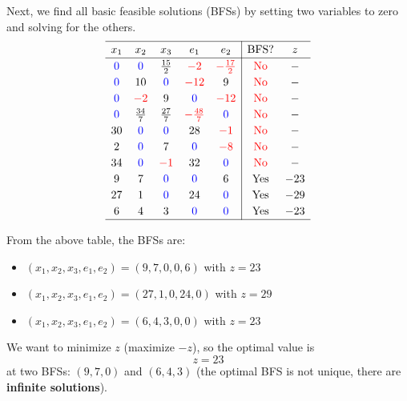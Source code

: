 \documentclass[a4paper, 10pt]{article}
\begin{document}
\begin{tosubmit}
Next, we find all basic feasible solutions (BFSs) by setting two variables to zero and solving for the others.
\[
\renewcommand{\arraystretch}{1.2}
\begin{array}{ccccc|cc}
    \hline
    x_1 & x_2 & x_3 & e_1 & e_2 & \text{BFS}? & z \\
    \hline
    \textcolor[HTML]{0000FF}{0} & \textcolor[HTML]{0000FF}{0} & \frac{15}{2} & \textcolor[HTML]{FF0000}{-2} & \textcolor[HTML]{FF0000}{-\frac{17}{2}} & \textcolor[HTML]{FF0000}{\text{No}} & - \\
    \textcolor[HTML]{0000FF}{0} & 10 & \textcolor[HTML]{0000FF}{0} & \textcolor[HTML]{FF0000}{-12} & 9 & \textcolor[HTML]{FF0000}{\text{No}} & - \\
    \textcolor[HTML]{0000FF}{0} & \textcolor[HTML]{FF0000}{-2} & 9 & \textcolor[HTML]{0000FF}{0} & \textcolor[HTML]{FF0000}{-12} & \textcolor[HTML]{FF0000}{\text{No}} & - \\
    \textcolor[HTML]{0000FF}{0} & \frac{34}{7} & \frac{27}{7} & \textcolor[HTML]{FF0000}{-\frac{48}{7}} & \textcolor[HTML]{0000FF}{0} & \textcolor[HTML]{FF0000}{\text{No}} & - \\
    30 & \textcolor[HTML]{0000FF}{0} & \textcolor[HTML]{0000FF}{0} & 28 & \textcolor[HTML]{FF0000}{-1} & \textcolor[HTML]{FF0000}{\text{No}} & - \\
    2 & \textcolor[HTML]{0000FF}{0} & 7 & \textcolor[HTML]{0000FF}{0} & \textcolor[HTML]{FF0000}{-8} & \textcolor[HTML]{FF0000}{\text{No}} & - \\
    34 & \textcolor[HTML]{0000FF}{0} & \textcolor[HTML]{FF0000}{-1} & 32 & \textcolor[HTML]{0000FF}{0} & \textcolor[HTML]{FF0000}{\text{No}} & - \\
    9 & 7 & \textcolor[HTML]{0000FF}{0} & \textcolor[HTML]{0000FF}{0} & 6 & \text{Yes} & -23 \\
    27 & 1 & \textcolor[HTML]{0000FF}{0} & 24 & \textcolor[HTML]{0000FF}{0} & \text{Yes} & -29 \\
    6 & 4 & 3 & \textcolor[HTML]{0000FF}{0} & \textcolor[HTML]{0000FF}{0} & \text{Yes} & -23 \\
    \hline
\end{array}
\]

From the above table, the BFSs are:
\begin{itemize}
    \item \( (x_1, x_2, x_3, e_1, e_2) = (9, 7, 0, 0, 6) \) with \( z = 23 \)
    \item \( (x_1, x_2, x_3, e_1, e_2) = (27, 1, 0, 24, 0) \) with \( z = 29 \)
    \item \( (x_1, x_2, x_3, e_1, e_2) = (6, 4, 3, 0, 0) \) with \( z = 23 \)
\end{itemize}

We want to minimize \( z \) (maximize \( -z \)), so the optimal value is \[ \boxed{z = 23} \] at two BFSs: \( (9, 7, 0) \) and \( (6, 4, 3) \) (the optimal BFS is not unique, there are \textbf{infinite solutions}).
\end{tosubmit}
\end{document}

